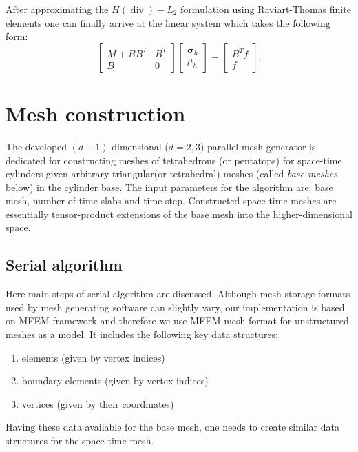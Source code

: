 \documentclass[12pt]{article}
\renewcommand{\div}{\operatorname{div}}
\def\bsigma{{\boldsymbol \sigma}}
\begin{document}
After approximating the $H(\div) - L_2$ formulation using Raviart-Thomas finite elements one can finally arrive at the linear system which takes the following form:
$$
\left[
\begin{array}{cc}
M + BB^T & B^T \\
B & 0 
\end{array} \right]  
\left[
\begin{array}{c}
\bsigma_h \\
\mu_h
\end{array}
\right]
 = \left[
\begin{array}{c}
B^T f\\
f
\end{array} \right].
$$

\section{Mesh construction}
The developed $(d+1)$-dimensional ($d=2,3$) parallel mesh generator is dedicated for constructing meshes of tetrahedrons (or pentatops) for space-time cylinders given arbitrary triangular(or tetrahedral) meshes (called \textit{base meshes} below) in the cylinder base. The input parameters for the algorithm are: base mesh, number of time slabs and time step. Constructed space-time meshes are essentially tensor-product extensions of the base mesh into the higher-dimensional space. %

\subsection{Serial algorithm}
Here main steps of serial algorithm are discussed. Although mesh storage formats used by mesh generating software can slightly vary, our implementation is based on MFEM \cite{mfem} framework and therefore we use MFEM mesh format for unstructured meshes as a model. It includes the following key data structures: 
\begin{enumerate}
\item elements (given by vertex indices)
\item boundary elements (given by vertex indices)
\item vertices (given by their coordinates)
\end{enumerate}
Having these data available for the base mesh, one needs to create similar data structures for the space-time mesh. 
\end{document}
